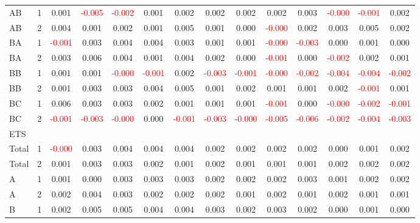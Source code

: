 \begin{table}[!htb]
{\begin{tabular}{llcccccccccccc}
AB & 1 & 0.001 & \textcolor{red}{-0.005} & \textcolor{red}{-0.002} & 0.001 & 0.002 & 0.002 & 0.002 & 0.002 & 0.003 & \textcolor{red}{-0.000} & \textcolor{red}{-0.001} & 0.002\\
AB & 2 & 0.004 & 0.001 & 0.002 & 0.001 & 0.005 & 0.001 & 0.000 & \textcolor{red}{-0.000} & 0.002 & 0.003 & 0.005 & 0.002\\
BA & 1 & \textcolor{red}{-0.001} & 0.003 & 0.004 & 0.004 & 0.003 & 0.001 & 0.001 & \textcolor{red}{-0.000} & \textcolor{red}{-0.003} & 0.000 & 0.001 & 0.000\\
BA & 2 & 0.003 & 0.006 & 0.004 & 0.001 & 0.004 & 0.002 & 0.000 & \textcolor{red}{-0.001} & 0.000 & \textcolor{red}{-0.002} & 0.002 & 0.001\\
BB & 1 & 0.001 & 0.001 & \textcolor{red}{-0.000} & \textcolor{red}{-0.001} & 0.002 & \textcolor{red}{-0.003} & \textcolor{red}{-0.001} & \textcolor{red}{-0.000} & \textcolor{red}{-0.002} & \textcolor{red}{-0.004} & \textcolor{red}{-0.004} & \textcolor{red}{-0.002}\\
BB & 2 & 0.001 & 0.003 & 0.003 & 0.004 & 0.005 & 0.001 & 0.002 & 0.001 & 0.001 & 0.002 & \textcolor{red}{-0.001} & 0.001\\
BC & 1 & 0.006 & 0.003 & 0.003 & 0.002 & 0.001 & 0.001 & 0.001 & \textcolor{red}{-0.001} & 0.000 & \textcolor{red}{-0.000} & \textcolor{red}{-0.002} & \textcolor{red}{-0.001}\\
BC & 2 & \textcolor{red}{-0.001} & \textcolor{red}{-0.003} & \textcolor{red}{-0.000} & 0.000 & \textcolor{red}{-0.001} & \textcolor{red}{-0.003} & \textcolor{red}{-0.000} & \textcolor{red}{-0.005} & \textcolor{red}{-0.006} & \textcolor{red}{-0.002} & \textcolor{red}{-0.004} & \textcolor{red}{-0.003}\\
\hline
ETS &  &  &  &  &  &  &  &  &  &  &  &  & \\
\hline
Total & 1 & \textcolor{red}{-0.000} & 0.003 & 0.004 & 0.004 & 0.004 & 0.002 & 0.002 & 0.002 & 0.002 & 0.000 & 0.001 & 0.002\\
Total & 2 & 0.001 & 0.003 & 0.003 & 0.002 & 0.001 & 0.002 & 0.001 & 0.001 & 0.001 & 0.002 & 0.002 & 0.002\\
A & 1 & 0.001 & 0.000 & 0.003 & 0.003 & 0.003 & 0.002 & 0.002 & 0.002 & 0.003 & 0.001 & 0.002 & 0.002\\
A & 2 & 0.002 & 0.004 & 0.003 & 0.002 & 0.002 & 0.002 & 0.001 & 0.002 & 0.001 & 0.002 & 0.001 & 0.001\\
B & 1 & 0.002 & 0.005 & 0.005 & 0.004 & 0.004 & 0.003 & 0.002 & 0.003 & 0.002 & 0.000 & 0.001 & 0.000\\

\end{tabular}}
\end{table}
